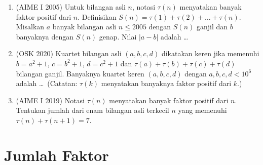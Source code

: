 \documentclass[12pt]{scrartcl}
\begin{document}
\begin{enumerate}
	\item (AIME I 2005)
	Untuk bilangan asli $n$, notasi $\tau(n)$ menyatakan banyak faktor positif
	dari $n$. Definisikan $S(n) = \tau(1) + \tau(2) + \dots + \tau(n)$.
	Misalkan $a$ banyak bilangan asli $n \le 2005$ dengan $S(n)$ ganjil
	dan $b$ banyaknya dengan $S(n)$ genap. Nilai $|a - b|$ adalah \dots

	\item (OSK 2020)
	Kuartet bilangan asli $(a, b, c, d)$ dikatakan keren jika memenuhi
	$b = a^{2} + 1$, $c = b^{2} + 1$, $d = c^{2} + 1$ dan
	$\tau(a) + \tau(b) + \tau(c) + \tau(d)$ bilangan ganjil.
	Banyaknya kuartet keren $(a, b, c, d)$ dengan $a, b, c, d < 10^{6}$
	adalah \dots\ (Catatan: $\tau(k)$ menyatakan banyaknya faktor positif dari $k$.)

	\item (AIME I 2019)
	Notasi $\tau(n)$ menyatakan banyak faktor positif dari $n$.
	Tentukan jumlah dari enam bilangan asli terkecil $n$ yang memenuhi
	$\tau(n) + \tau(n + 1) = 7$.

\end{enumerate}

\section{Jumlah Faktor}
\end{document}
